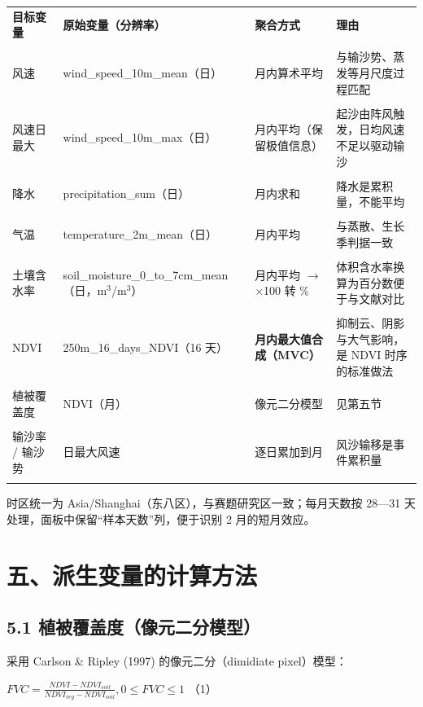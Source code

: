\documentclass[11pt,a4paper]{ctexart}
\begin{document}
\begin{table}[H]\centering\small\setlength{\parskip}{2pt}
\begin{tabularx}{\textwidth}{|X|X|X|X|}
\toprule
\textbf{目标变量} & \textbf{原始变量（分辨率）} & \textbf{聚合方式} & \textbf{理由} \\\\
\midrule
风速 & wind\_speed\_10m\_mean（日） & 月内算术平均 & 与输沙势、蒸发等月尺度过程匹配 \\\\
风速日最大 & wind\_speed\_10m\_max（日） & 月内平均（保留极值信息） & 起沙由阵风触发，日均风速不足以驱动输沙 \\\\
降水 & precipitation\_sum（日） & 月内求和 & 降水是累积量，不能平均 \\\\
气温 & temperature\_2m\_mean（日） & 月内平均 & 与蒸散、生长季判据一致 \\\\
土壤含水率 & soil\_moisture\_0\_to\_7cm\_mean（日，m$^{3}$/m$^{3}$） & 月内平均 $\to$ $\times$100 转 \% & 体积含水率换算为百分数便于与文献对比 \\\\
NDVI & 250m\_16\_days\_NDVI（16 天） & \textbf{月内最大值合成（MVC）} & 抑制云、阴影与大气影响，是 NDVI 时序的标准做法 \\\\
植被覆盖度 & NDVI（月） & 像元二分模型 & 见第五节 \\\\
输沙率 / 输沙势 & 日最大风速 & 逐日累加到月 & 风沙输移是事件累积量 \\\\
\bottomrule
\end{tabularx}
\end{table}
时区统一为 Asia/Shanghai（东八区），与赛题研究区一致；每月天数按 28—31 天处理，面板中保留“样本天数”列，便于识别 2 月的短月效应。


\section*{五、派生变量的计算方法}

\subsection*{5.1 植被覆盖度（像元二分模型）}
采用 Carlson \& Ripley (1997) 的像元二分（dimidiate pixel）模型：

$FVC=\frac{NDVI-{NDVI}_{soil}}{{NDVI}_{veg}-{NDVI}_{soil}},  0{\le}FVC{\le}1$  （1）
\end{document}
